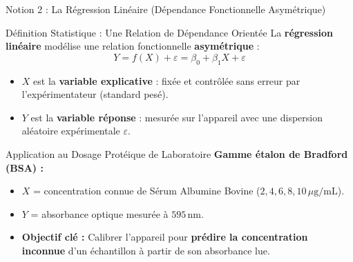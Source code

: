 \documentclass[aspectratio=169,10pt]{beamer}
\begin{document}
\begin{frame}{Notion 2 : La Régression Linéaire (Dépendance Fonctionnelle Asymétrique)}
  \begin{conceptbox}{Définition Statistique : Une Relation de Dépendance Orientée}
    \footnotesize
    La \textbf{régression linéaire} modélise une relation fonctionnelle \textbf{asymétrique} :
    \begin{equation*}
      Y = f(X) + \varepsilon = \beta_0 + \beta_1 X + \varepsilon
    \end{equation*}
    \begin{itemize}
      \item $X$ est la \textbf{variable explicative} : fixée et contrôlée sans erreur par l'expérimentateur (standard pesé).
      \item $Y$ est la \textbf{variable réponse} : mesurée sur l'appareil avec une dispersion aléatoire expérimentale $\varepsilon$.
    \end{itemize}
  \end{conceptbox}
  \vspace{1mm}
  \begin{biobox}{Application au Dosage Protéique de Laboratoire}
    \footnotesize
    \textbf{Gamme étalon de Bradford (BSA) :}
    \begin{itemize}
      \item $X$ = concentration connue de Sérum Albumine Bovine ($2, 4, 6, 8, 10\,\mu\text{g/mL}$).
      \item $Y$ = absorbance optique mesurée à $595\,\text{nm}$.
      \item \textbf{Objectif clé :} Calibrer l'appareil pour \textbf{prédire la concentration inconnue} d'un échantillon à partir de son absorbance lue.
    \end{itemize}
  \end{biobox}
\end{frame}
\end{document}
